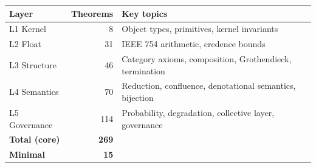 \begin{center}
\begin{tabular}{lrl}
\toprule
Layer & Theorems & Key topics \\
\midrule
L1 Kernel & 8 & Object types, primitives, kernel invariants \\
L2 Float & 31 & IEEE 754 arithmetic, credence bounds \\
L3 Structure & 46 & Category axioms, composition, Grothendieck, termination \\
L4 Semantics & 70 & Reduction, confluence, denotational semantics, bijection \\
L5 Governance & 114 & Probability, degradation, collective layer, governance \\
\midrule
\textbf{Total (core)} & \textbf{269} & \\
\textbf{Minimal} & \textbf{15} & \\
\bottomrule
\end{tabular}
\end{center}
